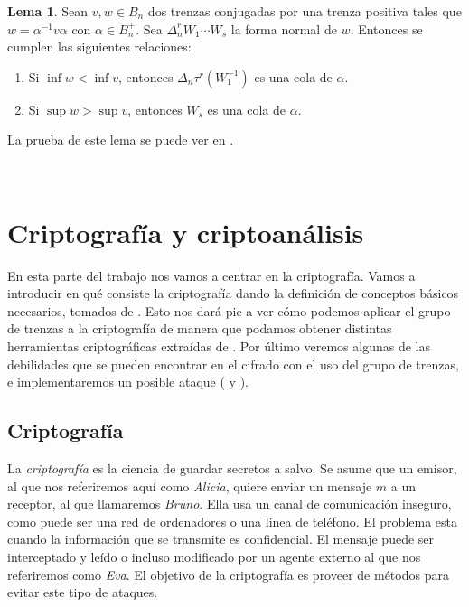 \documentclass[12pt]{book}
\theoremstyle{definition}
\newtheorem{lema}{Lema}[section]
\begin{document}
\begin{lema}
Sean $v,w\in B_n$ dos trenzas conjugadas por una trenza positiva tales que $w = \alpha^{-1}v\alpha$ con $\alpha\in B_n^{+}$. Sea $\Delta^r_n W_1\cdots W_s$ la forma normal de $w$. Entonces se cumplen las siguientes relaciones:
\begin{enumerate}
\item Si $\inf w < \inf v$, entonces $\Delta_n\tau^r(W_1^{-1})$ es una cola de $\alpha$.
\item Si $\sup w > \sup v$, entonces $W_s$ es una cola de $\alpha$.
\end{enumerate}
\label{lema:criptoanalisis}
\end{lema}
La prueba de este lema se puede ver en \cite{Alg}.






























\ 
\newline
\newline
\part{Criptografía y criptoanálisis}

En esta parte del trabajo nos vamos a centrar en la criptografía. Vamos a introducir en qué consiste la criptografía dando la definición de conceptos básicos necesarios, tomados de \cite{in_cr}. Esto nos dará pie a ver cómo podemos aplicar el grupo de trenzas a la criptografía de manera que podamos obtener distintas herramientas criptográficas extraídas de \cite{Deh}. Por último veremos algunas de las debilidades que se pueden encontrar en el cifrado con el uso del grupo de trenzas, e implementaremos un posible ataque (\cite{Att} y \cite{in_cr}).

\chapter{Criptografía}


La \textit{criptografía} es la ciencia de guardar secretos a salvo. Se asume que un emisor, al que nos referiremos aquí como \textit{Alicia}, quiere enviar un mensaje $m$ a un receptor, al que llamaremos \textit{Bruno}. Ella usa un canal de comunicación inseguro, como puede ser una red de ordenadores o una linea de teléfono. El problema esta cuando la información que se transmite es confidencial. El mensaje puede ser interceptado y leído o incluso modificado por un agente externo al que nos referiremos como \textit{Eva}. El objetivo de la criptografía es proveer de métodos para evitar este tipo de ataques.
\end{document}
